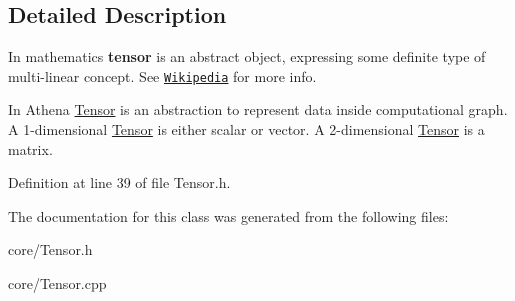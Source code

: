 \subsection{Detailed Description}
In mathematics {\bfseries tensor} is an abstract object, expressing some definite type of multi-\/linear concept. See \href{https://en.wikipedia.org/wiki/Tensor_(intrinsic_definition)}{\tt Wikipedia} for more info. 

In Athena \mbox{\hyperlink{classathena_1_1core_1_1_tensor}{Tensor}} is an abstraction to represent data inside computational graph. A 1-\/dimensional \mbox{\hyperlink{classathena_1_1core_1_1_tensor}{Tensor}} is either scalar or vector. A 2-\/dimensional \mbox{\hyperlink{classathena_1_1core_1_1_tensor}{Tensor}} is a matrix. 

Definition at line 39 of file Tensor.\+h.



The documentation for this class was generated from the following files\+:\begin{DoxyCompactItemize}
\item 
core/Tensor.\+h\item 
core/Tensor.\+cpp\end{DoxyCompactItemize}
